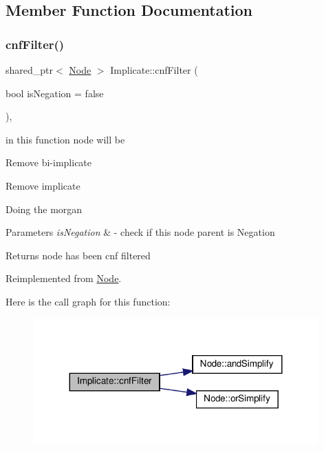 \subsection{Member Function Documentation}
\mbox{\label{class_implicate_a84e18887eae8891eec583aafaf2bf63d}} 
\subsubsection{\texorpdfstring{cnf\+Filter()}{cnfFilter()}}
{\footnotesize\ttfamily shared\+\_\+ptr$<$ \hyperlink{class_node}{Node} $>$ Implicate\+::cnf\+Filter (\begin{DoxyParamCaption}\item[{bool}]{is\+Negation = {\ttfamily false} }\end{DoxyParamCaption})\hspace{0.3cm}{\ttfamily [override]}, {\ttfamily [virtual]}}



in this function node will be 


\begin{DoxyItemize}
\item Remove bi-\/implicate
\item Remove implicate
\item Doing the morgan 
\begin{DoxyParams}{Parameters}
{\em is\+Negation} & -\/ check if this node parent is Negation \\
\hline
\end{DoxyParams}
\begin{DoxyReturn}{Returns}
node has been cnf filtered 
\end{DoxyReturn}

\end{DoxyItemize}

Reimplemented from \hyperlink{class_node_ab5b01fd3c4efe0f2eaf7fc41653359b7}{Node}.

Here is the call graph for this function\+:\nopagebreak
\begin{figure}[H]
\begin{center}
\leavevmode
\includegraphics[width=311pt]{de/d28/class_implicate_a84e18887eae8891eec583aafaf2bf63d_cgraph}
\end{center}
\end{figure}
\mbox{\label{class_implicate_a08cf8aa03589f7a34400a5f636f1256a}} 
